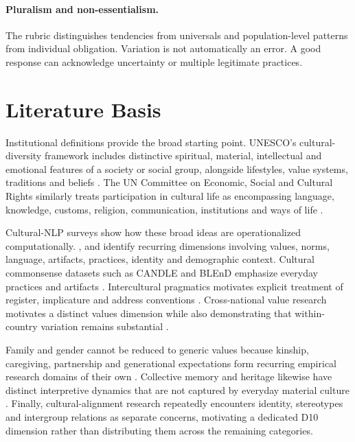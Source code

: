 \paragraph{Pluralism and non-essentialism.}
The rubric distinguishes tendencies from universals and population-level patterns from individual obligation. Variation is not automatically an error. A good response can acknowledge uncertainty or multiple legitimate practices.

\section{Literature Basis}

Institutional definitions provide the broad starting point. UNESCO's cultural-diversity framework includes distinctive spiritual, material, intellectual and emotional features of a society or social group, alongside lifestyles, value systems, traditions and beliefs \parencite{unesco2001culturaldiversity}. The UN Committee on Economic, Social and Cultural Rights similarly treats participation in cultural life as encompassing language, knowledge, customs, religion, communication, institutions and ways of life \parencite{cescr2009gc21}.

Cultural-NLP surveys show how these broad ideas are operationalized computationally. \textcite{adilazuarda2024culture}, \textcite{liu2025culturallyaware} and \textcite{pawar2025culturalawareness} identify recurring dimensions involving values, norms, language, artifacts, practices, identity and demographic context. Cultural commonsense datasets such as CANDLE and BLEnD emphasize everyday practices and artifacts \parencite{nguyen2023candle,myung2024blend}. Intercultural pragmatics motivates explicit treatment of register, implicature and address conventions \parencite{kecskes2014intercultural}. Cross-national value research motivates a distinct values dimension while also demonstrating that within-country variation remains substantial \parencite{schwartz1999culturalvalues,inglehartbaker2000modernization}.

Family and gender cannot be reduced to generic values because kinship, caregiving, partnership and generational expectations form recurring empirical research domains of their own \parencite{georgas2006families,inglehartnorris2003rising}. Collective memory and heritage likewise have distinct interpretive dynamics that are not captured by everyday material culture \parencite{assmann1995collective}. Finally, cultural-alignment research repeatedly encounters identity, stereotypes and intergroup relations as separate concerns, motivating a dedicated D10 dimension rather than distributing them across the remaining categories.


